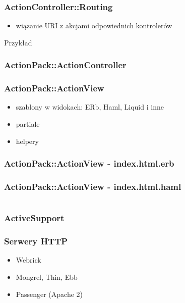 \documentclass[12t]{beamer}
\begin{document}
\begin{frame}
  \frametitle{ActionController::Routing}
  \begin{itemize}
  \item wiązanie URI z akcjami odpowiednich kontrolerów
  \end{itemize}
  \begin{block}{Przykład}
    
  \end{block}
\end{frame}

\begin{frame}
  \frametitle{ActionPack::ActionController}
  \begin{small}
  
  \end{small}
\end{frame}

\begin{frame}
  \frametitle{ActionPack::ActionView}
  \begin{itemize}
  \item szablony w widokach: ERb, Haml, Liquid i inne
  \item partiale
  \item helpery
  \end{itemize}
\end{frame}

\begin{frame}[fragile]
  \frametitle{ActionPack::ActionView - index.html.erb}
  
\end{frame}

\begin{frame}[fragile]
  \frametitle{ActionPack::ActionView - index.html.haml}
  \begin{footnotesize}
  \begin{columns}[T]
    \begin{column}{4cm}
      
    \end{column}
    \begin{column}{6cm}
      
    \end{column}
  \end{columns}
  \end{footnotesize}
\end{frame}

\begin{frame}
  \frametitle{ActiveSupport}
  
\end{frame}

\begin{frame}
  \frametitle{Serwery HTTP}
  \begin{itemize}
  \item Webrick
  \item Mongrel, Thin, Ebb
  \item Passenger (Apache 2)
  \end{itemize}
\end{frame}
\end{document}
